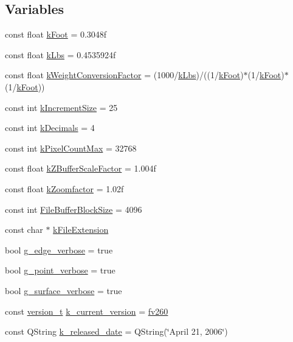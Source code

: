 \subsection*{Variables}
\begin{DoxyCompactItemize}
\item 
const float \hyperlink{namespaceShipCAD_a8c1484188fed1e735c5a94f64a6817ab}{k\-Foot} = 0.\-3048f
\item 
const float \hyperlink{namespaceShipCAD_ad6937518d9742e268b279000d1e7a509}{k\-Lbs} = 0.\-4535924f
\item 
const float \hyperlink{namespaceShipCAD_aa4319c8e7adfa68048f95c1614984036}{k\-Weight\-Conversion\-Factor} = (1000/\hyperlink{namespaceShipCAD_ad6937518d9742e268b279000d1e7a509}{k\-Lbs})/((1/\hyperlink{namespaceShipCAD_a8c1484188fed1e735c5a94f64a6817ab}{k\-Foot})$\ast$(1/\hyperlink{namespaceShipCAD_a8c1484188fed1e735c5a94f64a6817ab}{k\-Foot})$\ast$(1/\hyperlink{namespaceShipCAD_a8c1484188fed1e735c5a94f64a6817ab}{k\-Foot}))
\item 
const int \hyperlink{namespaceShipCAD_a1c0de7dc4306d7908bd8c6f7ff69ecdc}{k\-Increment\-Size} = 25
\item 
const int \hyperlink{namespaceShipCAD_ac88ffd27e117a3e612997a36a5d4616d}{k\-Decimals} = 4
\item 
const int \hyperlink{namespaceShipCAD_ac8176e9d12f859826fb131b7febb8c8a}{k\-Pixel\-Count\-Max} = 32768
\item 
const float \hyperlink{namespaceShipCAD_a519c591e5f5e3f60603b3133a4a2094e}{k\-Z\-Buffer\-Scale\-Factor} = 1.\-004f
\item 
const float \hyperlink{namespaceShipCAD_a80babe3fef93f1117e1c410f8d3c22c2}{k\-Zoomfactor} = 1.\-02f
\item 
const int \hyperlink{namespaceShipCAD_afeba968c9abef53c8d1ff63855076dec}{File\-Buffer\-Block\-Size} = 4096
\item 
const char $\ast$ \hyperlink{namespaceShipCAD_a76ec58fc6d779982def49fface17b1a4}{k\-File\-Extension}
\item 
bool \hyperlink{namespaceShipCAD_ad5a157bd082e37a863f05b7c54a1d7cc}{g\-\_\-edge\-\_\-verbose} = true
\item 
bool \hyperlink{namespaceShipCAD_ae059a88fbc18c56ceee2fd1cd7f2aad0}{g\-\_\-point\-\_\-verbose} = true
\item 
bool \hyperlink{namespaceShipCAD_a45538d3cd2c9293bf0bd4b09a23670ac}{g\-\_\-surface\-\_\-verbose} = true
\item 
const \hyperlink{namespaceShipCAD_af3a6fa23a7318acbda7b0066b53d694f}{version\-\_\-t} \hyperlink{namespaceShipCAD_aa3415e1acf9bdb19e24f31f5138d6a60}{k\-\_\-current\-\_\-version} = \hyperlink{namespaceShipCAD_af3a6fa23a7318acbda7b0066b53d694fa3e815680f28b362a51b70712e376e7d7}{fv260}
\item 
const Q\-String \hyperlink{namespaceShipCAD_a833fc6d39d2f0fd7fa31d0a691b0b726}{k\-\_\-released\-\_\-date} = Q\-String(\char`\"{}April 21, 2006\char`\"{})
\end{DoxyCompactItemize}


